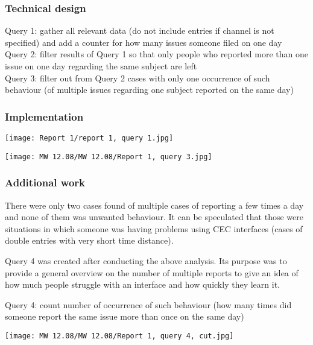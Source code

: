 			\subsubsection{Technical design}
Query 1: gather all relevant data (do not include entries if channel is not specified) and add a counter for how many issues someone filed on one day\\
Query 2: filter results of Query 1 so that only people who reported more than one issue on one day regarding the same subject are left\\
Query 3: filter out from Query 2 cases with only one occurrence of such behaviour (of multiple issues regarding one subject reported on the same day)

			\subsubsection{Implementation}

\begin{center}
  \texttt{[image: Report 1/report 1, query 1.jpg]}
\end{center}

\begin{center}
  \texttt{[image: MW 12.08/MW 12.08/Report 1, query 3.jpg]}
\end{center}
	
			\subsubsection{Additional work}
			
There were only two cases found of multiple cases of reporting a few times a day and none of them was unwanted behaviour. It can be speculated that those were situations in which someone was having problems using CEC interfaces (cases of double entries with very short time distance).

Query 4 was created after conducting the above analysis. Its purpose was to provide a general overview on the number of multiple reports to give an idea of how much people struggle with an interface and how quickly they learn it.

Query 4: count number of occurrence of such behaviour (how many times did someone report the same issue more than once on the same day)

\begin{center}
  \texttt{[image: MW 12.08/MW 12.08/Report 1, query 4, cut.jpg]}
\end{center}



